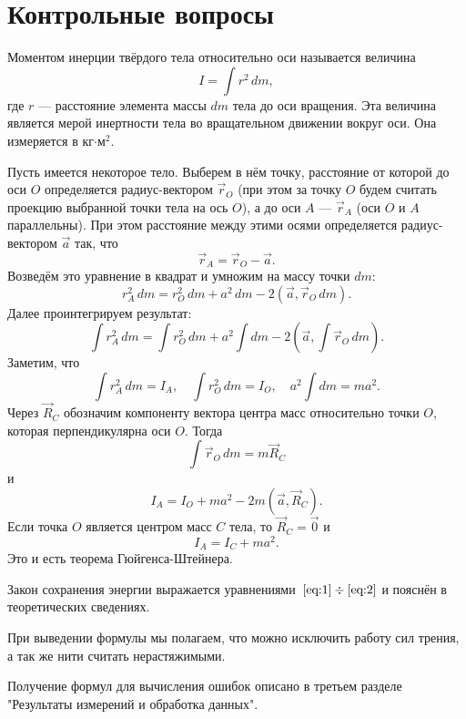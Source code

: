 \section{Контрольные вопросы}

\begin{Enumerate}
	\item Моментом инерции твёрдого тела относительно оси называется величина
	\[
	I=\int r^2\,dm,
	\]
	где $r$ --- расстояние элемента массы $dm$ тела до оси вращения. Эта величина является мерой инертности тела во вращательном движении вокруг оси. Она измеряется в кг$\cdot$м$^2$.
	
	\item Пусть имеется некоторое тело. Выберем в нём точку, расстояние от которой до оси $O$ определяется радиус-вектором $\vec r_O$ (при этом за точку $O$ будем считать проекцию выбранной точки тела на ось $O$), а до оси $A$ --- $\vec r_A$ (оси $O$ и $A$ параллельны). При этом расстояние между этими осями определяется радиус-вектором $\vec a$ так, что
	\[
	\vec r_A=\vec r_O-\vec a.
	\]
	Возведём это уравнение в квадрат и умножим на массу точки $dm$:
	\[
	r_A^2\,dm=r_O^2\,dm+a^2\,dm-2\left(\vec a,\vec r_O\,dm\right).
	\]
	Далее проинтегрируем результат:
	\[
	\int r_A^2\,dm=\int r_O^2\,dm+a^2\int dm-2\left(\vec a,\int\vec r_O\,dm\right).
	\]
	Заметим, что
	\[
	\int r_A^2\,dm=I_A,\quad \int r_O^2\,dm=I_O,\quad a^2\int dm=ma^2.
	\]
	Через $\vec R_C$ обозначим компоненту вектора центра масс относительно точки $O$, которая перпендикулярна оси $O$. Тогда
	\[
	\int\vec r_O\,dm=m\vec R_C
	\]
	и
	\[
	I_A=I_O+ma^2-2m\left(\vec a,\vec R_C\right).
	\]
	Если точка $O$ является центром масс $C$ тела, то $\vec R_C=\vec 0$ и
	\[
	I_A=I_C+ma^2.
	\]
	Это и есть теорема Гюйгенса-Штейнера.
	
	\item Закон сохранения энергии выражается уравнениями~$\eqref{eq:1}\div\eqref{eq:2}$ и пояснён в теоретических сведениях.
	
	\item При выведении формулы мы полагаем, что можно исключить работу сил трения, а так же нити считать нерастяжимыми.
	
	\item Получение формул для вычисления ошибок описано в третьем разделе "Результаты измерений и обработка данных"{}.
\end{Enumerate}